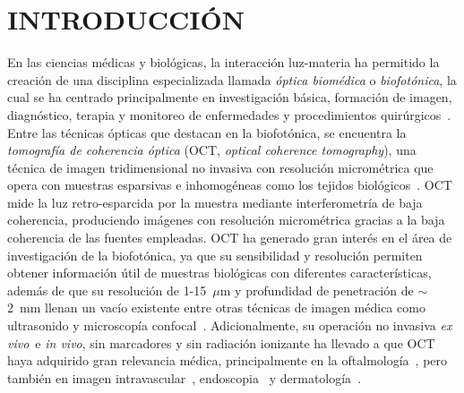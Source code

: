 \documentclass[letter, 12 pt]{article}
\newcommand{\exvi}{\textit{ex vivo}\ }
\begin{document}
\section{INTRODUCCIÓN}

En las ciencias médicas y biológicas, la interacción luz-materia ha permitido la creación de una disciplina especializada llamada \textit{óptica biomédica} o \textit{biofotónica}, la cual se ha centrado principalmente en investigación básica, formación de imagen, diagnóstico, terapia y monitoreo de enfermedades y procedimientos quirúrgicos~\cite{Keiser2016_Biophotonics}. Entre las técnicas ópticas que destacan en la biofotónica, se encuentra la \textit{tomografía de coherencia óptica} (OCT, \textit{optical coherence tomography}), una técnica de imagen tridimensional no invasiva con resolución micrométrica que opera con muestras esparsivas e inhomogéneas como los tejidos biológicos~\cite{huang1991}. OCT mide la luz retro-esparcida por la muestra mediante interferometría de baja coherencia, produciendo imágenes con resolución micrométrica gracias a la baja coherencia de las fuentes empleadas. OCT ha generado gran interés en el área de investigación de la biofotónica, ya que su sensibilidad y resolución permiten obtener información útil de muestras biológicas con diferentes características, además de que su resolución de 1-15~$\mu$m y profundidad de penetración  de $\sim$2~mm llenan un vacío existente entre otras técnicas de imagen médica como ultrasonido y microscopía confocal~\cite{drexler2015}. Adicionalmente, su operación no invasiva \exvi e \textit{in vivo}, sin marcadores y sin radiación ionizante ha llevado a que OCT haya adquirido gran relevancia médica, principalmente en la oftalmología~\cite{swanson1993, Ramos_2009}, pero también en imagen intravascular~\cite{Bouma2017_Medical}, endoscopia~\cite{Zhou_2015} y dermatología~\cite{Wang_2017}. \\ 
\end{document}
